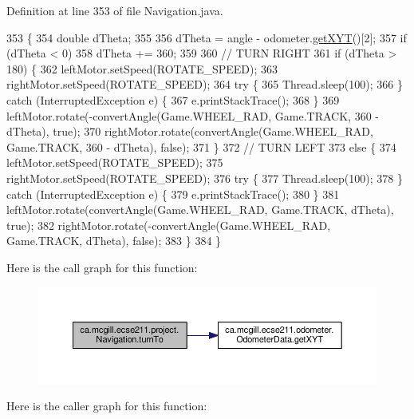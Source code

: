 Definition at line 353 of file Navigation.\+java.


\begin{DoxyCode}
353                                                 \{
354     \textcolor{keywordtype}{double} dTheta;
355 
356     dTheta = angle - odometer.\hyperlink{classca_1_1mcgill_1_1ecse211_1_1odometer_1_1_odometer_data_a8f40f0264c68f0cbed4fff1723ae7863}{getXYT}()[2];
357     \textcolor{keywordflow}{if} (dTheta < 0)
358       dTheta += 360;
359 
360     \textcolor{comment}{// TURN RIGHT}
361     \textcolor{keywordflow}{if} (dTheta > 180) \{
362       leftMotor.setSpeed(ROTATE\_SPEED);
363       rightMotor.setSpeed(ROTATE\_SPEED);
364       \textcolor{keywordflow}{try} \{
365         Thread.sleep(100);
366       \} \textcolor{keywordflow}{catch} (InterruptedException e) \{
367         e.printStackTrace();
368       \}
369       leftMotor.rotate(-convertAngle(Game.WHEEL\_RAD, Game.TRACK, 360 - dTheta), \textcolor{keyword}{true});
370       rightMotor.rotate(convertAngle(Game.WHEEL\_RAD, Game.TRACK, 360 - dTheta), \textcolor{keyword}{false});
371     \}
372     \textcolor{comment}{// TURN LEFT}
373     \textcolor{keywordflow}{else} \{
374       leftMotor.setSpeed(ROTATE\_SPEED);
375       rightMotor.setSpeed(ROTATE\_SPEED);
376       \textcolor{keywordflow}{try} \{
377         Thread.sleep(100);
378       \} \textcolor{keywordflow}{catch} (InterruptedException e) \{
379         e.printStackTrace();
380       \}
381       leftMotor.rotate(convertAngle(Game.WHEEL\_RAD, Game.TRACK, dTheta), \textcolor{keyword}{true});
382       rightMotor.rotate(-convertAngle(Game.WHEEL\_RAD, Game.TRACK, dTheta), \textcolor{keyword}{false});
383     \}
384   \}
\end{DoxyCode}
Here is the call graph for this function\+:\nopagebreak
\begin{figure}[H]
\begin{center}
\leavevmode
\includegraphics[width=350pt]{classca_1_1mcgill_1_1ecse211_1_1project_1_1_navigation_a3bbe0645f2b3b3d0986b4a707fb5a00c_cgraph}
\end{center}
\end{figure}
Here is the caller graph for this function\+:\nopagebreak

